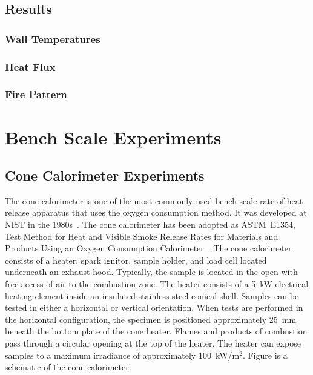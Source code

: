 \documentclass[twoside]{uocthesis}
\begin{document}
{{\section{Results}



\subsection{Wall Temperatures}

\subsection{Heat Flux}

\subsection{Fire Pattern}

\chapter{Bench Scale Experiments}

\section{Cone Calorimeter Experiments}

The cone calorimeter is one of the most commonly used bench-scale rate of heat release apparatus that uses the oxygen consumption method. It was developed at NIST in the 1980s~\cite{babrauskas:1984}. The cone calorimeter has been adopted as ASTM~E1354, Test Method for Heat and Visible Smoke Release Rates for Materials and Products Using an Oxygen Consumption Calorimeter~\cite{ASTM_E1354}. The cone calorimeter consists of a heater, spark ignitor, sample holder, and load cell located underneath an exhaust hood. Typically, the sample is located in the open with free access of air to the combustion zone. The heater consists of a 5~kW electrical heating element inside an insulated stainless-steel conical shell. Samples can be tested in either a horizontal or vertical orientation. When tests are performed in the horizontal configuration, the specimen is positioned approximately 25~mm beneath the bottom plate of the cone heater. Flames and products of combustion pass through a circular opening at the top of the heater. The heater can expose samples to a maximum irradiance of approximately 100~kW/m$^2$. Figure  is a schematic of the cone calorimeter.

}}
\end{document}
